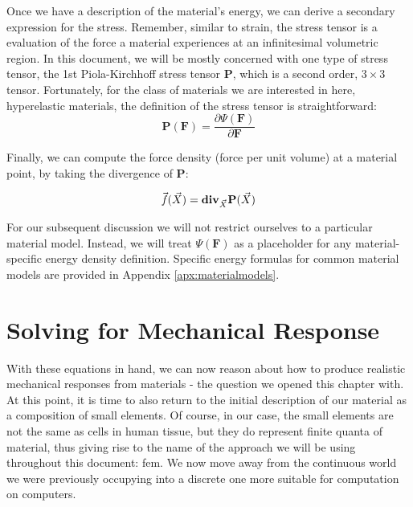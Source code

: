 Once we have a description of the material's energy, we can derive a
secondary expression for the stress. Remember, similar to strain, the
stress tensor is a evaluation of the force a material experiences at
an infinitesimal volumetric region. In this document, we will be mostly
concerned with one type of stress tensor, the 1st Piola-Kirchhoff
stress tensor $\mathbf{P}$, which is a second order, $3 \times 3$
tensor. Fortunately, for the class of materials we are interested in
here, hyperelastic materials, the definition of the stress tensor is
straightforward:
\begin{equation}
  \label{equ:piolakirchhoffstresstensor}
  \mathbf{P}(\mathbf F) = \frac{ \partial \Psi(\mathbf F)}{\partial
    \mathbf F}
\end{equation}

Finally, we can compute the force density (force per unit volume) at a
material point, by taking the divergence of $\mathbf P$:

\begin{equation}
  \label{equ:forcedensity}
  \vec{\mathit f}(\vec X) =
  \text{\textbf{div}}_{\vec X}\mathbf P (\vec X)
\end{equation}

For our subsequent discussion we will not restrict ourselves to a
particular material model. Instead, we will treat $\Psi(\mathbf{F})$
as a placeholder for any material-specific energy density
definition. Specific energy formulas for common material models are
provided in Appendix \ref{apx:materialmodels}.

\section{Solving for Mechanical Response}
\label{sec:engineering:solving}

With these equations in hand, we can now reason about how to produce
realistic mechanical responses from materials - the question we opened
this chapter with. At this point, it is time to also return to the
initial description of our material as a composition of small
elements. Of course, in our case, the small elements are not the same
as cells in human tissue, but they do represent finite quanta of
material, thus giving rise to the name of the approach we will be
using throughout this document: \gls{fem}. We now move away from the
continuous world we were previously occupying into a discrete one more
suitable for computation on computers.

